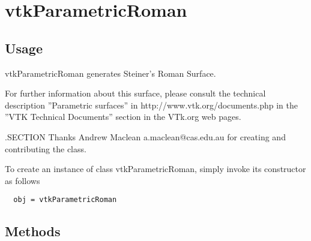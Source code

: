 \section{vtkParametricRoman}

\subsection{Usage}

 vtkParametricRoman generates Steiner's Roman Surface.

 For further information about this surface, please consult the 
 technical description ''Parametric surfaces'' in http://www.vtk.org/documents.php 
 in the ''VTK Technical Documents'' section in the VTk.org web pages.

 .SECTION Thanks
 Andrew Maclean a.maclean@cas.edu.au for 
 creating and contributing the class.


To create an instance of class vtkParametricRoman, simply
invoke its constructor as follows
\begin{verbatim}
  obj = vtkParametricRoman
\end{verbatim}
\subsection{Methods}

